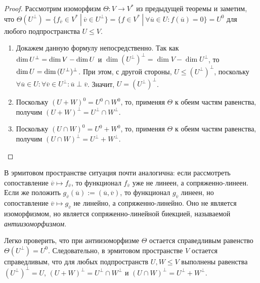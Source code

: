 \begin{proof}
	Рассмотрим изоморфизм $\Theta: V \rightarrow V^*$ из предыдущей теоремы и заметим, что $\Theta(U^\perp) = \{f_{\overline{v}} \in V^*~|~\overline{v} \in U^\perp\} = \{f \in V^*~|~\forall \overline{u} \in U: f(\overline{u}) = 0\} = U^0$ для любого подпространства $U \le V$.
	
	\begin{enumerate}
		\item Докажем данную формулу непосредственно. Так как $\dim{U^\perp} \hm{=} \dim{V} - \dim{U}$ и $\dim{(U^\perp)^\perp} = \dim{V} - \dim{U^\perp}$, то $\dim{U} \hm{=} \dim{(U^\perp)^\perp}$. При этом, с другой стороны, $U \le (U^\perp)^\perp$, поскольку $\forall \overline{u} \in U: \forall \overline{v} \in U^\perp: \overline{u} \perp \overline{v}$. Значит, $U = (U^\perp)^\perp$.
		
		\item Поскольку $(U + W)^0 = U^0 \cap W^0$, то, применяя $\Theta$ к обеим частям равенства, получим $(U + W)^\perp = U^\perp \cap W^\perp$.
		
		\item Поскольку $(U \cap W)^0 = U^0 + W^0$, то, применяя $\Theta$ к обеим частям равенства, получим $(U \cap W)^\perp = U^\perp + W^\perp$.\qedhere
	\end{enumerate}
\end{proof}

\begin{note}
	В эрмитовом пространстве ситуация почти аналогична: если рассмотреть сопоставление $\overline{v} \mapsto f_{\overline{v}}$, то функционал $f_{\overline{v}}$ уже не линеен, а сопряженно-линеен. Если же положить $g_{\overline{v}}(\overline{u}) := (\overline{u}, \overline{v})$, то функционал $g_{\overline{v}}$ линеен, но сопоставление $\overline{v} \mapsto g_{\overline{v}}$ не линейно, а сопряженно-линейно. Оно не является изоморфизмом, но является сопряженно-линейной биекцией, называемой \textit{антиизоморфизмом}.
	
	Легко проверить, что при антиизоморфизме $\Theta$ остается справедливым равенство $\Theta(U^\perp) = U^0$. Следовательно, в эрмитовом пространстве $V$ остается справедливым, что для любых подпространств $U, W \le V$ выполнены равенства $(U^\perp)^\perp = U$, $(U + W)^\perp = U^\perp \cap W^\perp$ и $(U \cap W)^\perp = U^\perp + W^\perp$.
\end{note}